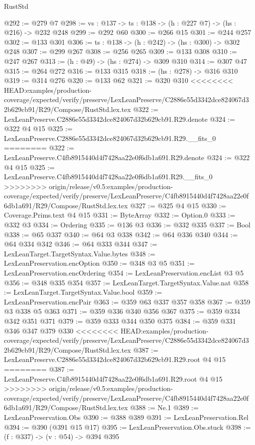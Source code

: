 \begin{lexlean}{RustStd}
\begin{coremodule}
{\begin{coremodule}
@292 := @279 @7
@298 := {vs : @137} -> {ts : @138} -> (h : @227 @7) -> (hs : @216) -> @232 @248
@299 := @292 @60
@300 := @266 @15
@301 := @244 @257
@302 := @133 @301
@306 := {ts : @138} -> (h : @242) -> (hs : @300) -> @302 @248
@307 := @299 @267
@308 := @256 @265
@309 := @133 @308
@310 := @247 @267
@313 := (h : @49) -> (hs : @274) -> @309 @310
@314 := @307 @47
@315 := @264 @272
@316 := @133 @315
@318 := (hs : @278) -> @316 @310
@319 := @314 @276
@320 := @133 @62
@321 := @320 @310
<<<<<<<< HEAD:examples/production-coverage/expected/verify/preserve/LexLeanPreserve/C2886e55d3342dce824067d32b629cb91/R29/Compose/RustStd.lex.tex
@322 := LexLeanPreserve.C2886e55d3342dce824067d32b629cb91.R29.denote
@324 := @322 @4 @15
@325 := LexLeanPreserve.C2886e55d3342dce824067d32b629cb91.R29.__fits_0
========
@322 := LexLeanPreserve.C4fb8915440d4f7428aa22e0f6db1a691.R29.denote
@324 := @322 @4 @15
@325 := LexLeanPreserve.C4fb8915440d4f7428aa22e0f6db1a691.R29.__fits_0
>>>>>>>> origin/release/v0.5:examples/production-coverage/expected/verify/preserve/LexLeanPreserve/C4fb8915440d4f7428aa22e0f6db1a691/R29/Compose/RustStd.lex.tex
@327 := @325 @4 @15
@330 := Coverage.Prims.text @4 @15
@331 := ByteArray
@332 := Option.{0}
@333 := @332 @3
@334 := Ordering
@335 := @136 @3
@336 := @332 @335
@337 := Bool
@338 := @65 @337
@340 := @64 @3 @338
@342 := @64 @336 @340
@344 := @64 @334 @342
@346 := @64 @333 @344
@347 := LexLeanTarget.TargetSyntax.Value.bytes
@348 := LexLeanPreservation.encOption
@350 := @348 @3 @5
@351 := LexLeanPreservation.encOrdering
@354 := LexLeanPreservation.encList @3 @5
@356 := @348 @335 @354
@357 := LexLeanTarget.TargetSyntax.Value.nat
@358 := LexLeanTarget.TargetSyntax.Value.bool
@359 := LexLeanPreservation.encPair
@363 := @359 @63 @337 @357 @358
@367 := @359 @3 @338 @5 @363
@371 := @359 @336 @340 @356 @367
@375 := @359 @334 @342 @351 @371
@379 := @359 @333 @344 @350 @375
@384 := @359 @331 @346 @347 @379 @330
<<<<<<<< HEAD:examples/production-coverage/expected/verify/preserve/LexLeanPreserve/C2886e55d3342dce824067d32b629cb91/R29/Compose/RustStd.lex.tex
@387 := LexLeanPreserve.C2886e55d3342dce824067d32b629cb91.R29.root @4 @15
========
@387 := LexLeanPreserve.C4fb8915440d4f7428aa22e0f6db1a691.R29.root @4 @15
>>>>>>>> origin/release/v0.5:examples/production-coverage/expected/verify/preserve/LexLeanPreserve/C4fb8915440d4f7428aa22e0f6db1a691/R29/Compose/RustStd.lex.tex
@388 := Ne.{1}
@389 := LexLeanPreservation.Obs
@390 := @388 @389
@391 := LexLeanPreservation.Rel
@394 := @390 (@391 @15 @17)
@395 := LexLeanPreservation.Obs.stuck
@398 := (f : @337) -> (v : @54) -> @394 @395

\end{coremodule}}
\end{coremodule}
\end{lexlean}
